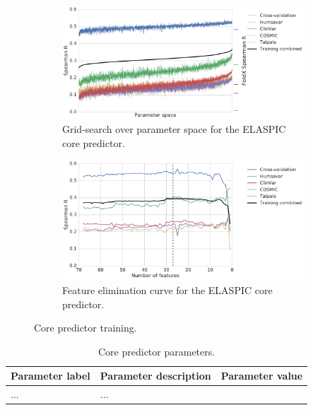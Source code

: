 \begin{figure}[ht]
	\centering

	\begin{subfigure}[b]{1.0\textwidth}
		\centering
		\includegraphics[width=0.6\linewidth]{static/elaspic_training_set/machine_learning/gridsearch_core.pdf}
		\caption{Grid-search over parameter space for the ELASPIC core predictor.}
		\label{fig:gridsearch_core}
	\end{subfigure}

	\begin{subfigure}[b]{1\textwidth}
		\centering
		\includegraphics[width=0.75\linewidth]{static/elaspic_training_set/machine_learning/feature_elimination_core.pdf}
		\caption{Feature elimination curve for the ELASPIC core predictor.}
		\label{fig:feature_elimination_core}
	\end{subfigure}

	\caption{Core predictor training.}
\end{figure}


\begin{table}[ht]
\caption{Core predictor parameters.} \label{tab:core_parameters}
\begin{tabular}{l | l | l}
	\toprule
	Parameter label & Parameter description & Parameter value \\
	\midrule
	... & ... \\
	\bottomrule
\end{tabular}
\end{table}


